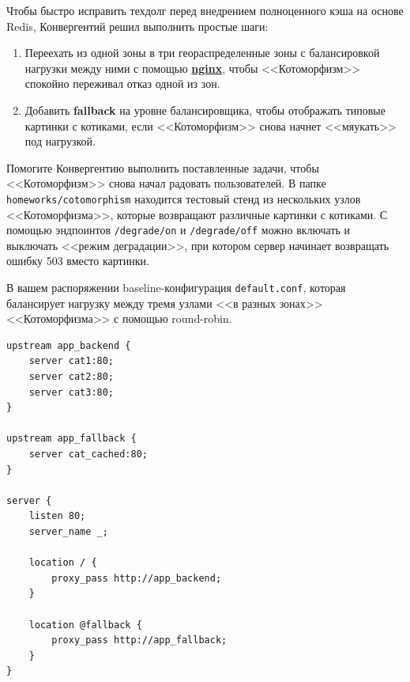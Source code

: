 \documentclass[12pt]{article}
\begin{document}
\begin{flushleft}
Чтобы быстро исправить техдолг перед внедрением полноценного кэша на основе Redis, Конвергентий решил выполнить простые шаги:
\begin{enumerate}
\item Переехать из одной зоны в три геораспределенные зоны с балансировкой нагрузки между ними
	  с помощью \href{https://nginx.org/en/docs/http/ngx_http_proxy_module.html}{\textbf{nginx}}, чтобы <<Котоморфизм>> спокойно переживал отказ одной из зон.
\item Добавить \textbf{fallback} на уровне балансировщика, чтобы отображать типовые картинки с котиками,
      если <<Котоморфизм>> снова начнет <<мяукать>> под нагрузкой.
\end{enumerate}
\end{flushleft}

\begin{flushleft}
Помогите Конвергентию выполнить поставленные задачи, чтобы <<Котоморфизм>> снова начал радовать пользователей.
В папке \texttt{homeworks/cotomorphism} находится тестовый стенд из нескольких узлов <<Котоморфизма>>,
которые возвращают различные картинки с котиками. С помощью эндпоинтов \texttt{/degrade/on} и \texttt{/degrade/off}
можно включать и выключать <<режим деградации>>, при котором сервер начинает возвращать ошибку 503 вместо картинки.
\end{flushleft}

\begin{flushleft}
В вашем распоряжении baseline-конфигурация \texttt{default.conf}, которая балансирует нагрузку между тремя узлами
<<в разных зонах>> <<Котоморфизма>> с помощью round-robin.
\end{flushleft}

\begin{verbatim}
upstream app_backend {
    server cat1:80;
    server cat2:80;
    server cat3:80;
}

upstream app_fallback {
    server cat_cached:80;
}

server {
    listen 80;
    server_name _;

    location / {
        proxy_pass http://app_backend;
    }

    location @fallback {
        proxy_pass http://app_fallback;
    }
}
\end{verbatim}
\end{document}
